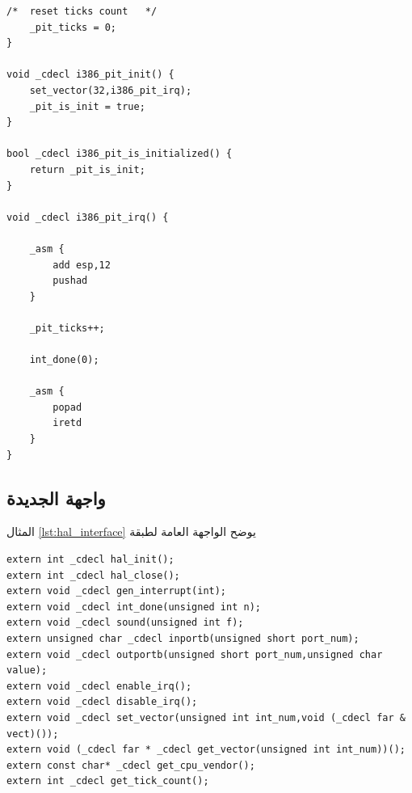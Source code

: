 \documentclass[document.tex]{subfiles}
\begin{document}
\begin{english}
\begin{lstlisting}[label=lst:pit_implementation,caption=\en{hal/pit.cpp: PIT Implementation}]
	/*	reset ticks count	*/
	_pit_ticks = 0;
}

void _cdecl i386_pit_init() {
	set_vector(32,i386_pit_irq);
	_pit_is_init = true;
}

bool _cdecl i386_pit_is_initialized() {
	return _pit_is_init;
}

void _cdecl i386_pit_irq() {
	
	_asm {
		add esp,12
		pushad
	}
	
	_pit_ticks++;
	
	int_done(0);
	
	_asm {
		popad
		iretd
	}
}
\end{lstlisting}
\end{english}

\subsection{واجهة  الجديدة}
المثال \ref{lst:hal_interface} يوضح الواجهة العامة لطبقة 
\begin{english}

\lstset{numberstyle=\tiny,numbers=left,stepnumber=1,numbersep=5pt,tabsize=2,extendedchars=true,breaklines=true,frame=b,showspaces=false, showtabs=false,xleftmargin=10pt,framexleftmargin=10pt,framexrightmargin=5pt,framexbottommargin=4pt,showstringspaces=false,language=C++}


\begin{lstlisting}[label=lst:hal_interface,caption=\en{New HAL Interface}]
extern int _cdecl hal_init();
extern int _cdecl hal_close();
extern void _cdecl gen_interrupt(int);
extern void _cdecl int_done(unsigned int n);
extern void _cdecl sound(unsigned int f);
extern unsigned char _cdecl inportb(unsigned short port_num);
extern void _cdecl outportb(unsigned short port_num,unsigned char value);
extern void _cdecl enable_irq();
extern void _cdecl disable_irq();
extern void _cdecl set_vector(unsigned int int_num,void (_cdecl far & vect)());
extern void (_cdecl far * _cdecl get_vector(unsigned int int_num))();
extern const char* _cdecl get_cpu_vendor();
extern int _cdecl get_tick_count();
\end{lstlisting}
\end{english}
\end{document}
